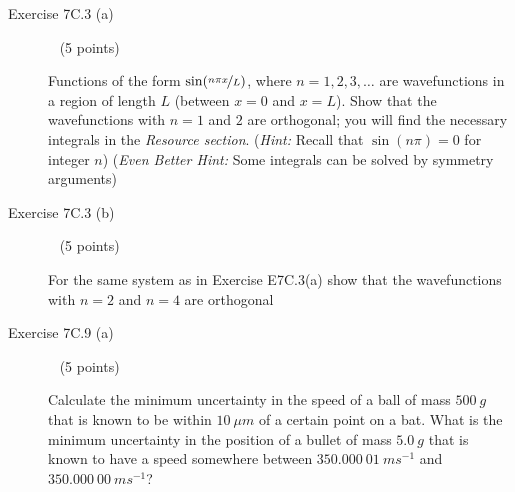 \documentclass[10pt, letterpaper]{memoir}
\begin{document}
\begin{description}
	\vspace{10em}
	\item [Exercise 7C.3 (a)] ~ (5 points)
	
	Functions of the form $\sin(\nicefrac{n\pi x}{L})$, where $n=1,2,3,\ldots$ are wavefunctions in a region of length $L$ (between $x=0$ and $x=L$). Show that the wavefunctions with $n=1$ and $2$ are orthogonal; you will find the necessary integrals in the \emph{Resource section}. (\emph{Hint:} Recall that $\sin(n\pi)=0$ for integer $n$) (\emph{Even Better Hint:} Some integrals can be solved by symmetry arguments)
	
	\vspace{10em}
	\item [Exercise 7C.3 (b)] ~ (5 points)
	
	For the same system as in Exercise E7C.3(a) show that the wavefunctions with $n=2$ and $n=4$ are orthogonal
	
	\vspace{10em}
	\item [Exercise 7C.9 (a)] ~ (5 points)
	
	Calculate the minimum uncertainty in the speed of a ball of mass $500~g$ that is known to be within $10~\mu m$ of a certain point on a bat. What is the minimum uncertainty in the position of a bullet of mass $5.0~g$ that is known to have a speed somewhere between $350.000~01~ms^{-1}$ and $350.000~00~ms^{-1}$?
\end{description}
\end{document}
